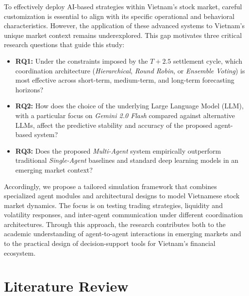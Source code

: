 \documentclass{ieeeaccess}
\begin{document}
To effectively deploy AI-based strategies within Vietnam's stock market, careful customization is essential to align with its specific operational and behavioral characteristics. However, the application of these advanced systems to Vietnam's unique market context remains underexplored. This gap motivates three critical research questions that guide this study:

\begin{itemize}
    
    \item \textbf{RQ1:} Under the constraints imposed by the $T+2.5$ settlement cycle, which coordination architecture (\textit{Hierarchical}, \textit{Round Robin}, or \textit{Ensemble Voting}) is most effective across short-term, medium-term, and long-term forecasting horizons?
    
    \item \textbf{RQ2:} How does the choice of the underlying Large Language Model (LLM), with a particular focus on \textit{Gemini 2.0 Flash} compared against alternative LLMs, affect the predictive stability and accuracy of the proposed agent-based system?

    \item \textbf{RQ3:} Does the proposed \textit{Multi-Agent} system empirically outperform traditional \textit{Single-Agent} baselines and standard deep learning models in an emerging market context?

\end{itemize}

Accordingly, we propose a tailored simulation framework that combines specialized agent modules and architectural designs to model Vietnamese stock market dynamics. The focus is on testing trading strategies, liquidity and volatility responses, and inter-agent communication under different coordination architectures. Through this approach, the research contributes both to the academic understanding of agent-to-agent interactions in emerging markets and to the practical design of decision-support tools for Vietnam’s financial ecosystem.



\section{Literature Review}
\label{sec:Literature Review}
\end{document}
